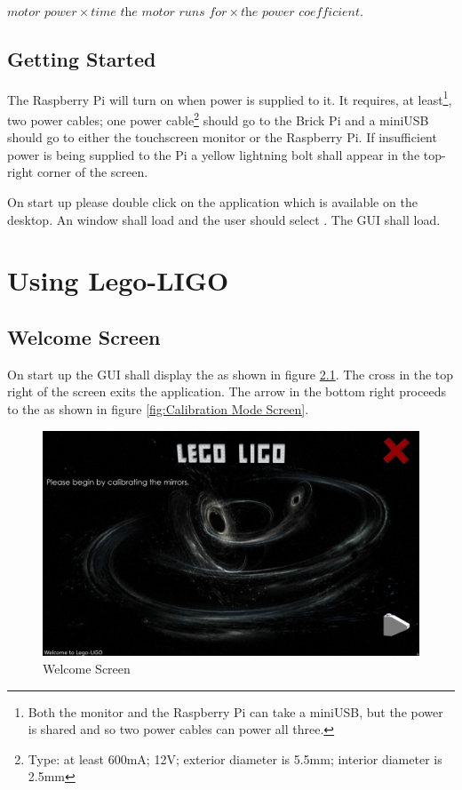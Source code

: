 \documentclass[a4paper, 12pt]{book}
\begin{document}
$\textit{motor power}\times\textit{time the motor runs for}\times\textit{the power coefficient}$.


\section{Getting Started}
The Raspberry Pi will turn on when power is supplied to it. It requires, at least\footnote{\label{power cables}Both the monitor and the Raspberry Pi can take a miniUSB, but the power is shared and so two power cables can power all three.}, two power cables; one power cable\footnote{\label{BrickPi power cable}Type: at least 600mA; 12V; exterior diameter is 5.5mm; interior diameter is 2.5mm} should go to the Brick Pi and a miniUSB should go to either the touchscreen monitor or the Raspberry Pi. If insufficient power is being supplied to the Pi a yellow lightning bolt shall appear in the top-right corner of the screen.

On start up please double click on the  application which is available on the desktop. An  window shall load and the user should select . The GUI shall load.


\chapter{Using Lego-LIGO}
\section{Welcome Screen}
On start up the GUI shall display the  as shown in figure \ref{fig:Welcome Screen}. The cross in the top right of the screen exits the application. The arrow in the bottom right proceeds to the  as shown in figure \ref{fig:Calibration Mode Screen}.
\begin{figure}[ht]
\centering
\includegraphics[width=120mm]{Welcome_Screen.png}
\caption{Welcome Screen}
\label{fig:Welcome Screen}
\end{figure}
\end{document}
